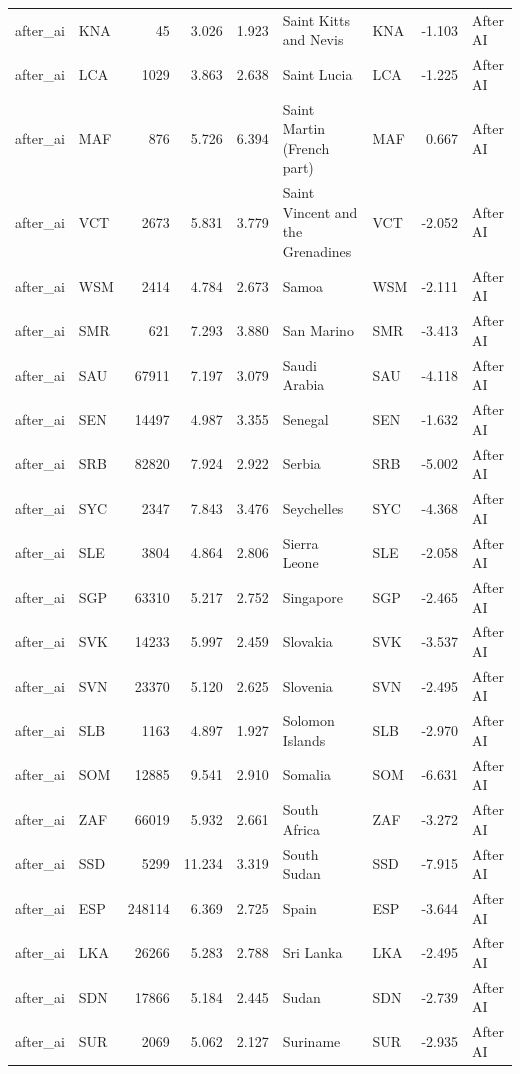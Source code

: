 \begin{tabular}{llrrrllrl}
after\_ai & KNA & 45 & 3.026 & 1.923 & Saint Kitts and Nevis & KNA & -1.103 & After AI \\
after\_ai & LCA & 1029 & 3.863 & 2.638 & Saint Lucia & LCA & -1.225 & After AI \\
after\_ai & MAF & 876 & 5.726 & 6.394 & Saint Martin (French part) & MAF & 0.667 & After AI \\
after\_ai & VCT & 2673 & 5.831 & 3.779 & Saint Vincent and the Grenadines & VCT & -2.052 & After AI \\
after\_ai & WSM & 2414 & 4.784 & 2.673 & Samoa & WSM & -2.111 & After AI \\
after\_ai & SMR & 621 & 7.293 & 3.880 & San Marino & SMR & -3.413 & After AI \\
after\_ai & SAU & 67911 & 7.197 & 3.079 & Saudi Arabia & SAU & -4.118 & After AI \\
after\_ai & SEN & 14497 & 4.987 & 3.355 & Senegal & SEN & -1.632 & After AI \\
after\_ai & SRB & 82820 & 7.924 & 2.922 & Serbia & SRB & -5.002 & After AI \\
after\_ai & SYC & 2347 & 7.843 & 3.476 & Seychelles & SYC & -4.368 & After AI \\
after\_ai & SLE & 3804 & 4.864 & 2.806 & Sierra Leone & SLE & -2.058 & After AI \\
after\_ai & SGP & 63310 & 5.217 & 2.752 & Singapore & SGP & -2.465 & After AI \\
after\_ai & SVK & 14233 & 5.997 & 2.459 & Slovakia & SVK & -3.537 & After AI \\
after\_ai & SVN & 23370 & 5.120 & 2.625 & Slovenia & SVN & -2.495 & After AI \\
after\_ai & SLB & 1163 & 4.897 & 1.927 & Solomon Islands & SLB & -2.970 & After AI \\
after\_ai & SOM & 12885 & 9.541 & 2.910 & Somalia & SOM & -6.631 & After AI \\
after\_ai & ZAF & 66019 & 5.932 & 2.661 & South Africa & ZAF & -3.272 & After AI \\
after\_ai & SSD & 5299 & 11.234 & 3.319 & South Sudan & SSD & -7.915 & After AI \\
after\_ai & ESP & 248114 & 6.369 & 2.725 & Spain & ESP & -3.644 & After AI \\
after\_ai & LKA & 26266 & 5.283 & 2.788 & Sri Lanka & LKA & -2.495 & After AI \\
after\_ai & SDN & 17866 & 5.184 & 2.445 & Sudan & SDN & -2.739 & After AI \\
after\_ai & SUR & 2069 & 5.062 & 2.127 & Suriname & SUR & -2.935 & After AI \\

\end{tabular}
